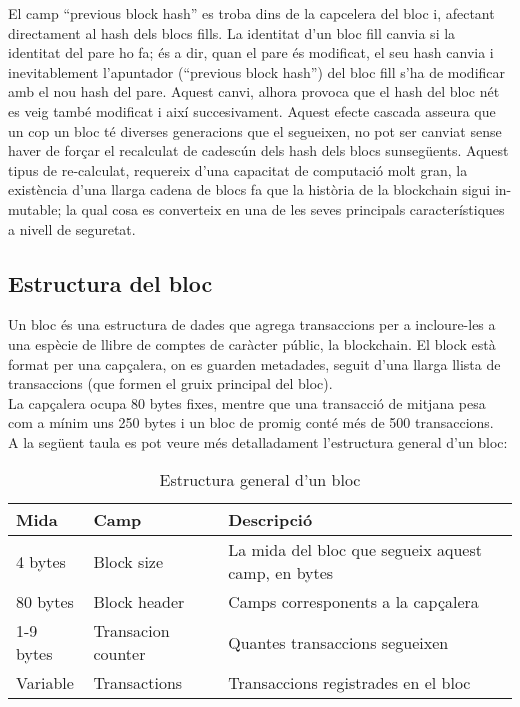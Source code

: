 \newline El camp “previous block hash” es troba dins de la capcelera del bloc i, afectant directament al hash dels blocs fills. La identitat d’un bloc fill canvia si la identitat del pare ho fa; és a dir, quan el pare és modificat, el seu hash canvia i inevitablement l’apuntador (“previous block hash”) del bloc fill s’ha de modificar amb el nou hash del pare. Aquest canvi, alhora provoca que el hash del bloc nét es veig també modificat i així succesivament. Aquest efecte cascada asseura que un cop un bloc té diverses generacions que el segueixen, no pot ser canviat sense haver de forçar el recalculat de cadescún dels hash dels blocs sunsegüents. Aquest tipus de re-calculat, requereix d’una capacitat de computació molt gran, la existència d’una llarga cadena de blocs fa que la història de la blockchain sigui in-mutable; la qual cosa es converteix en una de les seves principals característiques a nivell de seguretat.

\subsection{Estructura del bloc}
Un bloc és una estructura de dades que agrega transaccions per a incloure-les a una espècie de llibre de comptes de caràcter públic, la blockchain. El block està format per una capçalera, on es guarden metadades, seguit d’una llarga llista de transaccions (que formen el gruix principal del bloc). \\
\newline La capçalera ocupa 80 bytes fixes, mentre que una transacció de mitjana pesa com a mínim uns 250 bytes i un bloc de promig conté més de 500 transaccions.\\
\newline A la següent taula es pot veure més detalladament l'estructura general d'un bloc:
\begin{table}[ht]
    \centering
    \begin{tabular}{|l|l|l|} 
    \hline
    \textbf{Mida} & \textbf{Camp} & \textbf{Descripció} \\ [0.2ex] 
    \hline
    4 bytes & Block size & La mida del bloc que segueix aquest camp, en bytes \\
    80 bytes & Block header & Camps corresponents a la capçalera  \\
    1-9 bytes & Transacion counter & Quantes transaccions segueixen \\
    Variable & Transactions & Transaccions registrades en el bloc  \\[0.1ex] 
    \hline
    \end{tabular}
    \caption{Estructura general d'un bloc}
    \label{block_structure}
\end{table}


